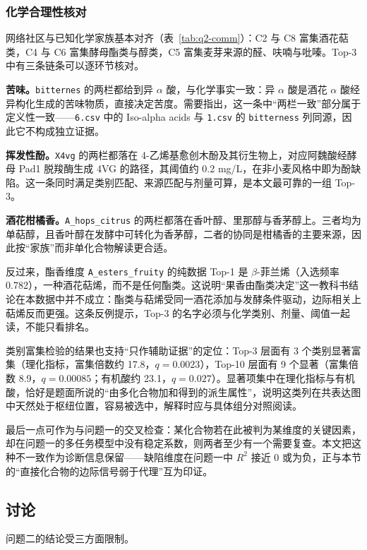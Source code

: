 ﻿\documentclass[UTF8,a4paper,zihao=-4]{ctexart}
\numberwithin{figure}{section}
\numberwithin{table}{section}
\numberwithin{equation}{section}
\newcommand{\file}[1]{\texttt{#1}}
\begin{document}
\subsubsection{化学合理性核对}

网络社区与已知化学家族基本对齐（表~\ref{tab:q2-comm}）：C2 与 C8 富集酒花萜类，C4 与 C6 富集酵母酯类与醇类，C5 富集麦芽来源的醛、呋喃与吡嗪。Top-3 中有三条链条可以逐环节核对。

\textbf{苦味。}\file{bitternes} 的两栏都给到异 $\alpha$ 酸，与化学事实一致：异 $\alpha$ 酸是酒花 $\alpha$ 酸经异构化生成的苦味物质，直接决定苦度。需要指出，这一条中“两栏一致”部分属于定义性一致——\file{6.csv} 中的 Iso-alpha acids 与 \file{1.csv} 的 \file{bitterness} 列同源，因此它不构成独立证据。

\textbf{挥发性酚。}\file{X4vg} 的两栏都落在 4-乙烯基愈创木酚及其衍生物上，对应阿魏酸经酵母 Pad1 脱羧酶生成 4VG 的路径，其阈值约 0.2 mg/L，在非小麦风格中即为酚缺陷。这一条同时满足类别匹配、来源匹配与剂量可算，是本文最可靠的一组 Top-3。

\textbf{酒花柑橘香。}\file{A\_hops\_citrus} 的两栏都落在香叶醇、里那醇与香茅醇上。三者均为单萜醇，且香叶醇在发酵中可转化为香茅醇，二者的协同是柑橘香的主要来源，因此按“家族”而非单化合物解读更合适。

反过来，酯香维度 \file{A\_esters\_fruity} 的纯数据 Top-1 是 $\beta$-菲兰烯（入选频率 0.782），一种酒花萜烯，而不是任何酯类。这说明“果香由酯类决定”这一教科书结论在本数据中并不成立：酯类与萜烯受同一酒花添加与发酵条件驱动，边际相关上萜烯反而更强。这条反例提示，Top-3 的名字必须与化学类别、剂量、阈值一起读，不能只看排名。

类别富集检验的结果也支持“只作辅助证据”的定位：Top-3 层面有 3 个类别显著富集（理化指标，富集倍数约 17.8，$q=0.0023$），Top-10 层面有 9 个显著（富集倍数 8.9，$q=0.00085$；有机酸约 23.1，$q=0.027$）。显著项集中在理化指标与有机酸，恰好是题面所说的“由多化合物加和得到的派生属性”，说明这类列在共表达图中天然处于枢纽位置，容易被选中，解释时应与具体组分对照阅读。

最后一点可作为与问题一的交叉检查：某化合物若在此被判为某维度的关键因素，却在问题一的多任务模型中没有稳定系数，则两者至少有一个需要复查。本文把这种不一致作为诊断信息保留——缺陷维度在问题一中 $R^2$ 接近 0 或为负，正与本节的“直接化合物的边际信号弱于代理”互为印证。

\subsection{讨论}

问题二的结论受三方面限制。
\end{document}
